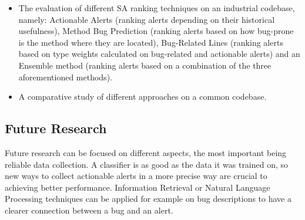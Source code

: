 \begin{itemize}
\item The evaluation of different SA ranking techniques on an industrial codebase, namely: Actionable Alerts (ranking alerts depending on their historical usefulness), Method Bug Prediction (ranking alerts based on how bug-prone is the method where they are located), Bug-Related Lines (ranking alerts based on type weights calculated on bug-related and actionable alerts) and an Ensemble method (ranking alerts based on a combination of the three aforementioned methods).
\item A comparative study of different approaches on a common codebase.

\end{itemize}




\subsection{Future Research}


Future research can be focused on different aspects, the most important being reliable data collection. A classifier is as good as the data it was trained on, so new ways to collect actionable alerts in a more precise way are crucial to achieving better performance. Information Retrieval or Natural Language Processing techniques can be applied for example on bug descriptions to have a clearer connection between a bug and an alert.


